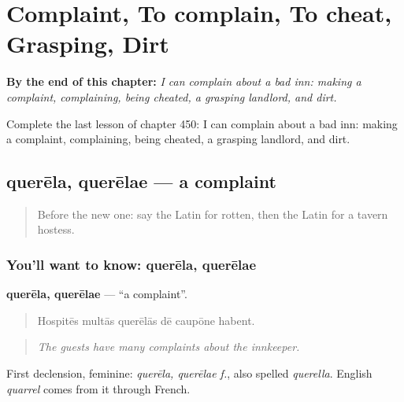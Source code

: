 
\chapter{Complaint, To complain, To cheat, Grasping, Dirt}
\label{ch:la-complaint-to-complain-to-cheat-grasping-dirt}

\begin{chapteropening}
\textbf{By the end of this chapter:} \emph{I can complain about a bad inn: making a complaint, complaining, being cheated, a grasping landlord, and dirt.}

Complete the last lesson of chapter 450: I can complain about a bad inn: making a complaint, complaining, being cheated, a grasping landlord, and dirt.
\end{chapteropening}

\section[querēla, querēlae]{querēla, querēlae — a complaint}

\label{lesson:LA-C450-querela}



\begin{quote}
Before the new one: say the Latin for rotten, then the Latin for a tavern hostess.
\end{quote}

\subsection*{You'll want to know: querēla, querēlae}
\textbf{querēla, querēlae} — \textquotedblleft{}a complaint\textquotedblright{}.

\begin{quote}
Hospitēs multās querēlās dē caupōne habent.
\end{quote}

\begin{quote}
\emph{The guests have many complaints about the innkeeper.}
\end{quote}

First declension, feminine: \emph{querēla, querēlae f.}, also spelled \emph{querella}. English \emph{quarrel} comes from it through French.

